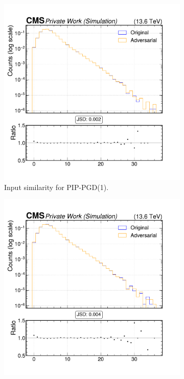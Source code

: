 \begin{figure}[h]
  \centering
  \begin{subfigure}[t]{0.32\textwidth}
    \includegraphics[width=\linewidth]{media/output/features/compare/combined_it_1/cmp_global_features_TagVarCSV_jetNSelectedTracks.pdf}
    \caption*{Input similarity for PIP-PGD(1).}
  \end{subfigure}\hfill
  \begin{subfigure}[t]{0.32\textwidth}
    \includegraphics[width=\linewidth]{media/output/features/compare/combined_it_2/cmp_global_features_TagVarCSV_jetNSelectedTracks.pdf}

\end{subfigure}
\end{figure}
